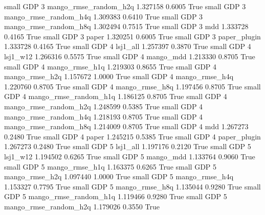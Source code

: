      small      GDP                 3 mango_rmse_random_h2q   1.327158      0.6005    True
     small      GDP                 3 mango_rmse_random_h4q   1.309383      0.6410    True
     small      GDP                 3 mango_rmse_random_h8q   1.302494      0.7515    True
     small      GDP                 3                   mdd   1.333728      0.4165    True
     small      GDP                 3                 paper   1.320251      0.6005    True
     small      GDP                 3          paper_plugin   1.333728      0.4165    True
     small      GDP                 4              lsj1_all   1.257397      0.3870    True
     small      GDP                 4              lsj1_w12   1.266316      0.5575    True
     small      GDP                 4             mango_mdd   1.213330      0.8705    True
     small      GDP                 4        mango_rmse_h1q   1.219303      0.8655    True
     small      GDP                 4        mango_rmse_h2q   1.157672      1.0000    True
     small      GDP                 4        mango_rmse_h4q   1.220760      0.8705    True
     small      GDP                 4        mango_rmse_h8q   1.197456      0.8705    True
     small      GDP                 4 mango_rmse_random_h1q   1.186125      0.8705    True
     small      GDP                 4 mango_rmse_random_h2q   1.248599      0.5385    True
     small      GDP                 4 mango_rmse_random_h4q   1.218193      0.8705    True
     small      GDP                 4 mango_rmse_random_h8q   1.214009      0.8705    True
     small      GDP                 4                   mdd   1.267273      0.2480    True
     small      GDP                 4                 paper   1.245215      0.5385    True
     small      GDP                 4          paper_plugin   1.267273      0.2480    True
     small      GDP                 5              lsj1_all   1.197176      0.2120    True
     small      GDP                 5              lsj1_w12   1.194502      0.6265    True
     small      GDP                 5             mango_mdd   1.133764      0.9060    True
     small      GDP                 5        mango_rmse_h1q   1.163375      0.6265    True
     small      GDP                 5        mango_rmse_h2q   1.097440      1.0000    True
     small      GDP                 5        mango_rmse_h4q   1.153327      0.7795    True
     small      GDP                 5        mango_rmse_h8q   1.135044      0.9280    True
     small      GDP                 5 mango_rmse_random_h1q   1.119466      0.9280    True
     small      GDP                 5 mango_rmse_random_h2q   1.179026      0.3550    True

